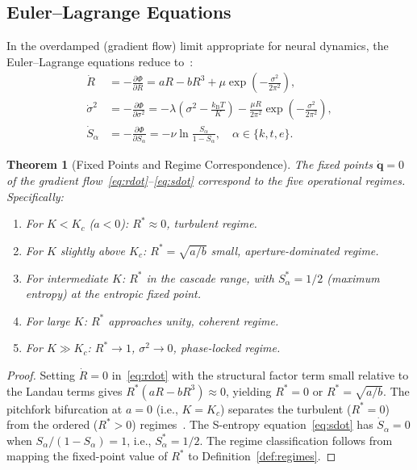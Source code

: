 \documentclass[11pt,twocolumn,a4paper]{article}
\newtheorem{theorem}{Theorem}[section]
\newcommand{\kb}{k_{\mathrm{B}}}
\newcommand{\Pot}{\Phi}
\newcommand{\qvec}{\mathbf{q}}
\begin{document}
\subsection{Euler--Lagrange Equations}

In the overdamped (gradient flow) limit appropriate for neural dynamics, the Euler--Lagrange equations reduce to~\cite{sachikonye2026lagrangian}:
\begin{align}
\dot{R} &= -\frac{\partial \Pot}{\partial R} = aR - bR^3 + \mu\exp\!\left(-\frac{\sigma^2}{2\pi^2}\right), \label{eq:rdot} \\
\dot{\sigma}^2 &= -\frac{\partial \Pot}{\partial \sigma^2} = -\lambda\!\left(\sigma^2 - \frac{\kb T}{K}\right) - \frac{\mu R}{2\pi^2}\exp\!\left(-\frac{\sigma^2}{2\pi^2}\right), \label{eq:s2dot} \\
\dot{S}_\alpha &= -\frac{\partial \Pot}{\partial S_\alpha} = -\nu \ln\!\frac{S_\alpha}{1 - S_\alpha}, \quad \alpha \in \{k,t,e\}. \label{eq:sdot}
\end{align}

\begin{theorem}[Fixed Points and Regime Correspondence]
\label{thm:fixedpoints}
The fixed points $\dot{\qvec} = 0$ of the gradient flow~\eqref{eq:rdot}--\eqref{eq:sdot} correspond to the five operational regimes.
Specifically:
\begin{enumerate}[label=(\roman*),leftmargin=*]
\item For $K < K_c$ ($a < 0$): $R^* \approx 0$, turbulent regime.
\item For $K$ slightly above $K_c$: $R^* = \sqrt{a/b}$ small, aperture-dominated regime.
\item For intermediate $K$: $R^*$ in the cascade range, with $S_\alpha^* = 1/2$ (maximum entropy) at the entropic fixed point.
\item For large $K$: $R^*$ approaches unity, coherent regime.
\item For $K \gg K_c$: $R^* \to 1$, $\sigma^2 \to 0$, phase-locked regime.
\end{enumerate}
\end{theorem}

\begin{proof}
Setting $\dot{R} = 0$ in~\eqref{eq:rdot} with the structural factor term small relative to the Landau terms gives $R^*(aR - bR^3) \approx 0$, yielding $R^* = 0$ or $R^* = \sqrt{a/b}$.
The pitchfork bifurcation at $a = 0$ (i.e., $K = K_c$) separates the turbulent ($R^* = 0$) from the ordered ($R^* > 0$) regimes~\cite{strogatz2000}.
The S-entropy equation~\eqref{eq:sdot} has $\dot{S}_\alpha = 0$ when $S_\alpha / (1 - S_\alpha) = 1$, i.e., $S_\alpha^* = 1/2$.
The regime classification follows from mapping the fixed-point value of $R^*$ to Definition~\ref{def:regimes}.
\end{proof}
\end{document}
